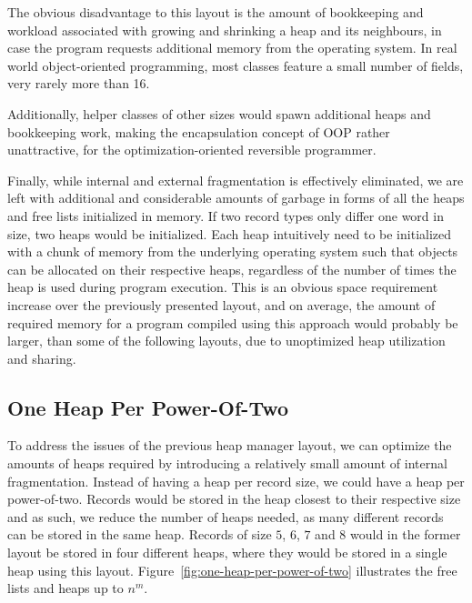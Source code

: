 The obvious disadvantage to this layout is the amount of bookkeeping and workload associated with growing and shrinking a heap and its neighbours, in case the program requests additional memory from the operating system. In real world object-oriented programming, most classes feature a small number of fields, very rarely more than 16. 

Additionally, helper classes of other sizes would spawn additional heaps and bookkeeping work, making the encapsulation concept of OOP rather unattractive, for the optimization-oriented reversible programmer. 

Finally, while internal and external fragmentation is effectively eliminated, we are left with additional and considerable amounts of garbage in forms of all the heaps and free lists initialized in memory. If two record types only differ one word in size, two heaps would be initialized. Each heap intuitively need to be initialized with a chunk of memory from the underlying operating system such that objects can be allocated on their respective heaps, regardless of the number of times the heap is used during program execution. This is an obvious space requirement increase over the previously presented layout, and on average, the amount of required memory for a program compiled using this approach would probably be larger, than some of the following layouts, due to unoptimized heap utilization and sharing.


\subsection{One Heap Per Power-Of-Two}
\label{subsec:one-heap-per-power-of-two}
To address the issues of the previous heap manager layout, we can optimize the amounts of heaps required by introducing a relatively small amount of internal fragmentation. Instead of having a heap per record size, we could have a heap per power-of-two. Records would be stored in the heap closest to their respective size and as such, we reduce the number of heaps needed, as many different records can be stored in the same heap. Records of size $5$, $6$, $7$ and $8$ would in the former layout be stored in four different heaps, where they would be stored in a single heap using this layout. Figure~\ref{fig:one-heap-per-power-of-two} illustrates the free lists and heaps up to $n^m$. 

